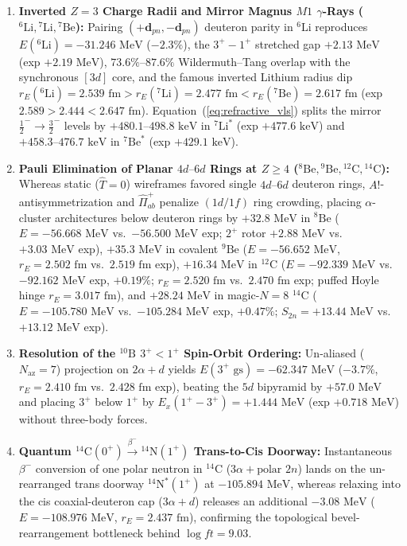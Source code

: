 \documentclass[11pt, a4paper]{article}
\begin{document}
\begin{enumerate}[leftmargin=1.8em, itemsep=2pt]
    \item \textbf{Inverted $Z = 3$ Charge Radii and Mirror Magnus $M1$ $\gamma$-Rays ($^6\text{Li}, {}^7\text{Li}, {}^7\text{Be}$):} Pairing $(+\mathbf{d}_{pn}, -\mathbf{d}_{pn})$ deuteron parity in $^6\text{Li}$ reproduces $E(^6\text{Li}) = -31.246\text{ MeV}$ ($-2.3\%$), the $3^+ - 1^+$ stretched gap $+2.13\text{ MeV}$ (exp $+2.19\text{ MeV}$), $73.6\%\text{--}87.6\%$ Wildermuth--Tang overlap with the synchronous $[3d]$ core, and the famous inverted Lithium radius dip $r_E(^6\text{Li}) = 2.539\text{ fm} > r_E(^7\text{Li}) = 2.477\text{ fm} < r_E(^7\text{Be}) = 2.617\text{ fm}$ (exp $2.589 > 2.444 < 2.647\text{ fm}$). Equation~(\ref{eq:refractive_vls}) splits the mirror $\frac{1}{2}^- \to \frac{3}{2}^-$ levels by $+480.1\text{--}498.8\text{ keV}$ in $^7\text{Li}^*$ (exp $+477.6\text{ keV}$) and $+458.3\text{--}476.7\text{ keV}$ in $^7\text{Be}^*$ (exp $+429.1\text{ keV}$).
    \item \textbf{Pauli Elimination of Planar $4d\text{--}6d$ Rings at $Z \ge 4$ ($^8\text{Be}, {}^9\text{Be}, {}^{12}\text{C}, {}^{14}\text{C}$):} Whereas static ($\hat{T}=0$) wireframes favored single $4d\text{--}6d$ deuteron rings, $A!$-antisymmetrization and $\hat{\Pi}_{ab}^+$ penalize $(1d/1f)$ ring crowding, placing $\alpha$-cluster architectures below deuteron rings by $+32.8\text{ MeV}$ in $^8\text{Be}$ ($E = -56.668\text{ MeV}$ vs.\ $-56.500\text{ MeV}$ exp; $2^+$ rotor $+2.88\text{ MeV}$ vs.\ $+3.03\text{ MeV}$ exp), $+35.3\text{ MeV}$ in covalent $^9\text{Be}$ ($E = -56.652\text{ MeV}$, $r_E = 2.502\text{ fm}$ vs.\ $2.519\text{ fm}$ exp), $+16.34\text{ MeV}$ in $^{12}\text{C}$ ($E = -92.339\text{ MeV}$ vs.\ $-92.162\text{ MeV}$ exp, $+0.19\%$; $r_E = 2.520\text{ fm}$ vs.\ $2.470\text{ fm}$ exp; puffed Hoyle hinge $r_E = 3.017\text{ fm}$), and $+28.24\text{ MeV}$ in magic-$N=8$ $^{14}\text{C}$ ($E = -105.780\text{ MeV}$ vs.\ $-105.284\text{ MeV}$ exp, $+0.47\%$; $S_{2n} = +13.44\text{ MeV}$ vs.\ $+13.12\text{ MeV}$ exp).
    \item \textbf{Resolution of the $^{10}\text{B}$ $3^+ < 1^+$ Spin-Orbit Ordering:} Un-aliased ($N_{\mathrm{az}} = 7$) projection on $2\alpha + d$ yields $E(3^+\text{ gs}) = -62.347\text{ MeV}$ ($-3.7\%$, $r_E = 2.410\text{ fm}$ vs.\ $2.428\text{ fm}$ exp), beating the $5d$ bipyramid by $+57.0\text{ MeV}$ and placing $3^+$ below $1^+$ by $E_x(1^+ - 3^+) = +1.444\text{ MeV}$ (exp $+0.718\text{ MeV}$) without three-body forces.
    \item \textbf{Quantum $^{14}\text{C}(0^+) \xrightarrow{\beta^-} {}^{14}\text{N}(1^+)$ Trans-to-Cis Doorway:} Instantaneous $\beta^-$ conversion of one polar neutron in $^{14}\text{C}$ ($3\alpha + \text{polar }2n$) lands on the un-rearranged trans doorway $^{14}\text{N}^*(1^+)$ at $-105.894\text{ MeV}$, whereas relaxing into the cis coaxial-deuteron cap ($3\alpha + d$) releases an additional $-3.08\text{ MeV}$ ($E = -108.976\text{ MeV}$, $r_E = 2.437\text{ fm}$), confirming the topological bevel-rearrangement bottleneck behind $\log ft = 9.03$.
\end{enumerate}
\end{document}
